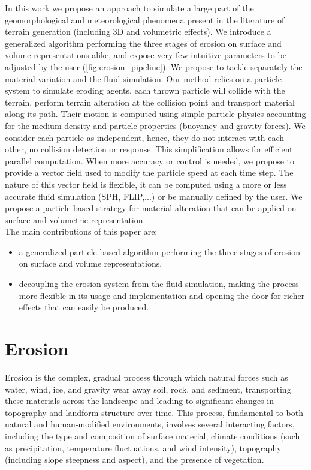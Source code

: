 In this work we propose an approach to simulate a large part of the geomorphological and meteorological phenomena present in the literature of terrain generation (including 3D and volumetric effects). We introduce a generalized algorithm performing the three stages of erosion on surface and volume representations alike, and expose very few intuitive parameters to be adjusted by the user (\cref{fig:erosion_pipeline}).
We propose to tackle separately the material variation and the fluid simulation. Our method relies on a particle system to simulate eroding agents, each thrown particle will collide with the terrain, perform terrain alteration at the collision point and transport material along its path. 
Their motion is computed using simple particle physics accounting for the medium density and particle properties (buoyancy and gravity forces). We consider each particle as independent, hence, they do not interact with each other, no collision detection or response. This simplification allows for efficient parallel computation. 
When more accuracy or control is needed, we propose to provide a vector field used to modify the particle speed at each time step. The nature of this vector field is flexible, it can be computed using a more or less accurate fluid simulation (SPH, FLIP,...) or be manually defined by the user. We propose a particle-based strategy for material alteration that can be applied on surface and volumetric representation. \\
The main contributions of this paper are: 
\begin{itemize}
\item a generalized particle-based algorithm performing the three
stages of erosion on surface and volume representations,
\item decoupling the erosion system from the fluid simulation, making the process more flexible in its usage and implementation and opening the door for richer effects that can easily be produced.
\end{itemize}

\section{Erosion}
Erosion is the complex, gradual process through which natural forces such as water, wind, ice, and gravity wear away soil, rock, and sediment, transporting these materials across the landscape and leading to significant changes in topography and landform structure over time. This process, fundamental to both natural and human-modified environments, involves several interacting factors, including the type and composition of surface material, climate conditions (such as precipitation, temperature fluctuations, and wind intensity), topography (including slope steepness and aspect), and the presence of vegetation.

